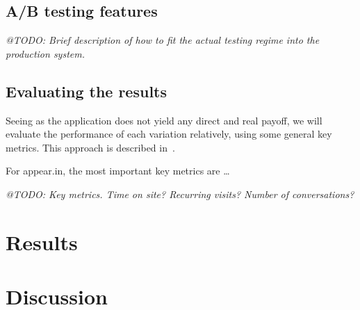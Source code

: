 
\subsection{A/B testing features} %
\label{sub:a_b_testing_features}

\emph{@TODO: Brief description of how to fit the actual testing regime into the production system.}


\subsection{Evaluating the results} %
\label{sub:evaluating_the_results}

Seeing as the application does not yield any direct and real payoff, we will evaluate the performance of each variation relatively, using some general key metrics. This approach is described in~\cite{Yue2012}.

For appear.in, the most important key metrics are \ldots

\emph{@TODO: Key metrics. Time on site? Recurring visits? Number of conversations?}



\section{Results} %
\label{sec:results}


\section{Discussion} %
\label{sec:discussion}


